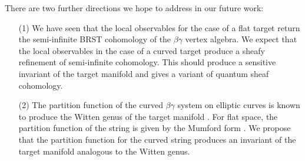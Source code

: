 There are two further directions we hope to address in our future work:
\begin{itemize}
\item[(1)] We have seen that the local observables for the case of a flat target return the semi-infinite BRST cohomology of the $\beta\gamma$ vertex algebra. 
We expect that the local observables in the case of a curved target produce a sheafy refinement of semi-infinite cohomology. 
This should produce a sensitive invariant of the target manifold and gives a variant of quantum sheaf cohomology. 
\item[(2)] The partition function of the curved $\beta\gamma$ system on elliptic curves is known to produce the Witten genus of the target manifold \cite{wg2}. 
For flat space, the partition function of the string is given by the Mumford form \cite{BM}. 
We propose that the partition function for the curved string produces an invariant of the target manifold analogous to the Witten genus. 
\end{itemize}


